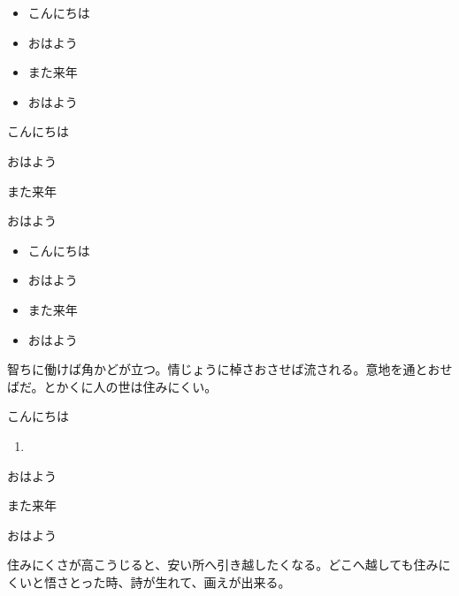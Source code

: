 \documentclass[book, twoside, paper=b5j, fleqn, jafontsize=9pt, jafontscale=0.91, head_space=22mm, foot_space=9mm, fore-edge=16mm, gutter=25mm, hanging_punctuation]{jlreq}
\begin{document}
\newpage
\begin{framebox-key}
    \begin{itemize}
        \item こんにちは
        \item おはよう
        \item また来年
        \item おはよう
    \end{itemize}
    \begin{enumerate-brackets}
        \item こんにちは
        \item おはよう
        \item また来年
        \item おはよう
    \end{enumerate-brackets}
\end{framebox-key}

\begin{itemize}
    \item こんにちは
    \item おはよう
    \item また来年
    \item おはよう
\end{itemize}

智ちに働けば角かどが立つ。情じょうに棹さおさせば流される。意地を通とおせばだ。とかくに人の世は住みにくい。

\begin{enumerate-brackets}
    \item こんにちは
    \begin{enumerate}
        \item 
    \end{enumerate}
    \item おはよう
    \item また来年
    \item おはよう
\end{enumerate-brackets}

住みにくさが高こうじると、安い所へ引き越したくなる。どこへ越しても住みにくいと悟さとった時、詩が生れて、画えが出来る。
\end{document}
